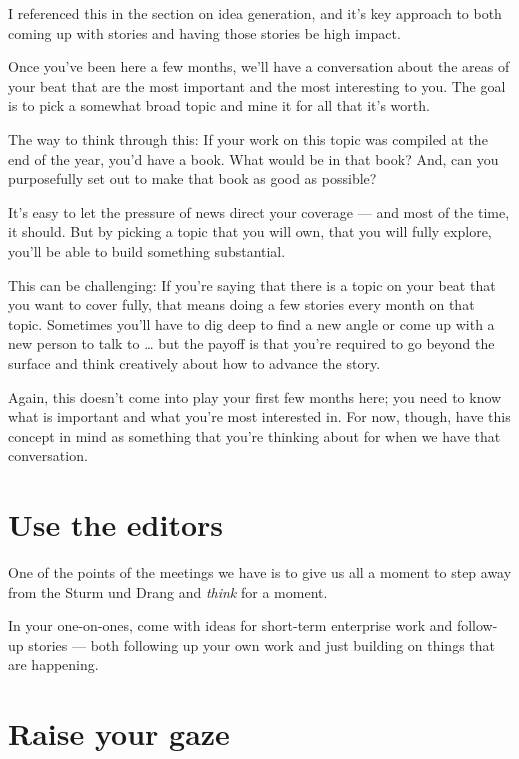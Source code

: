 \documentclass[
  11pt,
  american,
  letterpaperpaper,
  extrafontsizes,onecolumn,openright
  ]{memoir}
\newlength{\rf}
\begin{document}
I referenced this in the section on idea generation, and it's key approach to both coming up with stories and having those stories be high impact.

Once you've been here a few months, we'll have a conversation about the areas of your beat that are the most important and the most interesting to you. The goal is to pick a somewhat broad topic and mine it for all that it's worth.

The way to think through this: If your work on this topic was compiled at the end of the year, you'd have a book. What would be in that book? And, can you purposefully set out to make that book as good as possible?

It's easy to let the pressure of news direct your coverage --- and most of the time, it should. But by picking a topic that you will own, that you will fully explore, you'll be able to build something substantial.

This can be challenging: If you're saying that there is a topic on your beat that you want to cover fully, that means doing a few stories every month on that topic. Sometimes you'll have to dig deep to find a new angle or come up with a new person to talk to \ldots{} but the payoff is that you're required to go beyond the surface and think creatively about how to advance the story.

Again, this doesn't come into play your first few months here; you need to know what is important and what you're most interested in. For now, though, have this concept in mind as something that you're thinking about for when we have that conversation.

\hypertarget{use-the-editors-1}{%
\section*{Use the editors}\label{use-the-editors-1}}

One of the points of the meetings we have is to give us all a moment to step away from the Sturm und Drang and \emph{think} for a moment.

In your one-on-ones, come with ideas for short-term enterprise work and follow-up stories --- both following up your own work and just building on things that are happening.

\hypertarget{raise-your-gaze}{%
\section*{Raise your gaze}\label{raise-your-gaze}}
\end{document}
